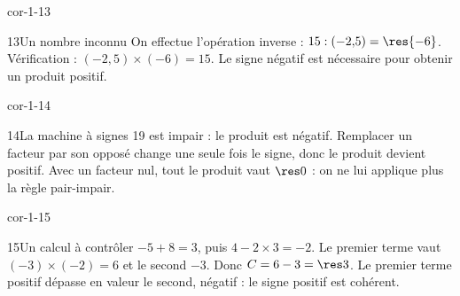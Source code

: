 \begin{blocLivre}{cor-1-13}\begin{corrige}{13}{Un nombre inconnu}
On effectue l’opération inverse : $15:(-2{,}5)=\res{-6}$. Vérification : $(-2{,}5)\times(-6)=15$. Le signe négatif est nécessaire pour obtenir un produit positif.
\end{corrige}\end{blocLivre}
\begin{blocLivre}{cor-1-14}\begin{corrige}{14}{La machine à signes}
19 est impair : le produit est négatif. Remplacer un facteur par son opposé change une seule fois le signe, donc le produit devient positif. Avec un facteur nul, tout le produit vaut $\res0$ : on ne lui applique plus la règle pair-impair.
\end{corrige}\end{blocLivre}
\begin{blocLivre}{cor-1-15}\begin{corrige}{15}{Un calcul à contrôler}
$-5+8=3$, puis $4-2\times3=-2$. Le premier terme vaut $(-3)\times(-2)=6$ et le second $-3$. Donc $C=6-3=\res3$. Le premier terme positif dépasse en valeur le second, négatif : le signe positif est cohérent.
\end{corrige}\end{blocLivre}
